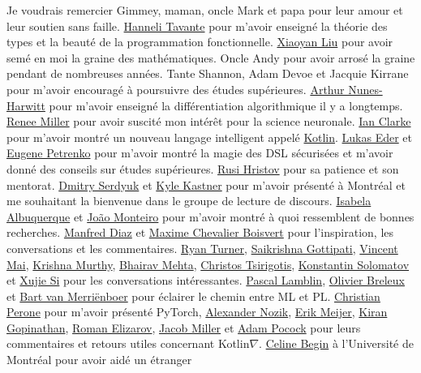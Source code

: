 \vspace{-60pt} Je voudrais remercier Gimmey, maman, oncle Mark et papa pour leur amour et leur soutien sans faille. \href{http://hannelita.com/}{Hanneli Tavante} pour m'avoir enseigné la théorie des types et la beauté de la programmation fonctionnelle. \href{https://laverne.edu/directory/person/xiaoyan-liu/}{Xiaoyan Liu} pour avoir semé en moi la graine des mathématiques. Oncle Andy pour avoir arrosé la graine pendant de nombreuses années. Tante Shannon, Adam Devoe et Jacquie Kirrane pour m'avoir encouragé à poursuivre des études supérieures. \href{https://www.cs.rit.edu/~anh/}{Arthur Nunes-Harwitt} pour m'avoir enseigné la différentiation algorithmique il y a longtemps. \href{https://www.sas.rochester.edu/bcs/people/faculty/miller_renee/index.html}{Renee Miller} pour avoir suscité mon intérêt pour la science neuronale. \href{http://blog.locut.us}{Ian Clarke} pour m'avoir montré un nouveau langage intelligent appelé \href{https://kotlinlang.org/}{Kotlin}. \href{https://www.jooq.org/}{Lukas Eder} et \href{https://jonnyzzz.com/}{Eugene Petrenko} pour m'avoir montré la magie des DSL sécurisées et m'avoir donné des conseils sur études supérieures. \href{https://github.com/rusi}{Rusi Hristov} pour sa patience et son mentorat. \href{https://scholar.google.ca/citations?user=PsKlNzUAAAAJ}{Dmitry Serdyuk} et \href{http://kastnerkyle.github.io/}{Kyle Kastner} pour m'avoir présenté à Montréal et me souhaitant la bienvenue dans le groupe de lecture de discours. \href{https://scholar.google.ca/citations?user=-Ss9QGkAAAAJ}{Isabela Albuquerque} et \href{https://scholar.google.ca/citations?user=hkO47vsAAAAJ}{Jo\~ao Monteiro} pour m'avoir montré à quoi ressemblent de bonnes recherches. \href{https://takeitallsource.github.io}{Manfred Diaz} et \href{https://pointersgonewild.com/}{Maxime Chevalier Boisvert} pour l'inspiration, les conversations et les commentaires. \href{http://TurnerComputing.com}{Ryan Turner}, \href{https://saikrishna-1996.github.io}{Saikrishna Gottipati}, \href{https://maivincent.github.io}{Vincent Mai}, \href{https://krrish94.github.io/}{Krishna Murthy}, \href{https://bhairavmehta95.github.io/}{Bhairav ​​Mehta}, \href{https://mila.quebec/fr/person/christos-tsirigotis/}{Christos Tsirigotis}, \href{http://www.solomatov.me/}{Konstantin Solomatov} et \href{https://www.seas.upenn.edu/~ xsi/}{Xujie Si} pour les conversations intéressantes. \href{https://scholar.google.ca/citations?user=bn4xHHIAAAAJ}{Pascal Lamblin}, \href{http://breuleux.net}{Olivier Breleux} et \href{https://scholar.google.ca/citations? user = XE9SDzgAAAAJ}{Bart van Merri\"enboer} pour éclairer le chemin entre ML et PL. \href{http://christianperone.com}{Christian Perone} pour m'avoir présenté PyTorch, \href{https://research.jetbrains.org/researchers/altavir}{Alexander Nozik}, \href{https://twitter.com/headinthebox}{Erik Meijer}, \href{https://scholar.google.com/citations?user=IcuGXgcAAAAJ}{Kiran Gopinathan}, \href{https://medium.com/@elizarov}{Roman Elizarov}, \href{https://cquic.unm.edu/member/jacob.miller/}{Jacob Miller} et \href{http://www.adampocock.com/}{Adam Pocock} pour leurs commentaires et retours utiles concernant Kotlin$\nabla$. \href{https://diro.umontreal.ca/accueil/}{Celine Begin} à l'Université de Montréal pour avoir aidé un étranger 